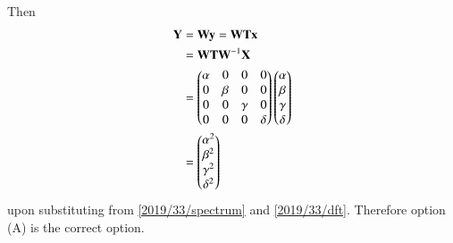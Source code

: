 %
Then 
\begin{align}
    \mathbf{Y} &= \mathbf{W}\mathbf{y} = \mathbf{W}\mathbf{T}\mathbf{x}
    \\
    &=\mathbf{W}\mathbf{T}\mathbf{W}^{-1}\mathbf{X} 
    \\
    &= \begin{pmatrix}\alpha & 0 & 0 & 0\\ 0 & \beta & 0 & 0\\ 0 & 0 & \gamma & 0\\ 0 & 0 & 0 & \delta\end{pmatrix}\begin{pmatrix}\alpha \\ \beta \\ \gamma \\ \delta\end{pmatrix}
    \\
    &= \begin{pmatrix}\alpha^2 \\ \beta^2 \\ \gamma^2\\ \delta^2\end{pmatrix}
\end{align}
upon substituting from \eqref{2019/33/spectrum} and \eqref{2019/33/dft}.
Therefore option (A) is the correct option.
